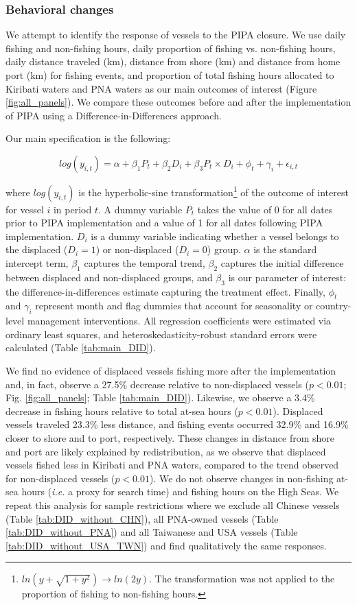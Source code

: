 \documentclass[12pt]{article}
\begin{document}
\subsubsection{Behavioral changes}

We attempt to identify the response of vessels to the PIPA closure. We use daily fishing and non-fishing hours, daily proportion of fishing vs. non-fishing hours, daily distance traveled (km), distance from shore (km) and distance from home port (km) for fishing events, and proportion of total fishing hours allocated to Kiribati waters and PNA waters as our main outcomes of interest (Figure \ref{fig:all_panels}). We compare these outcomes before and after the implementation of PIPA using a Difference-in-Differences approach.

Our main specification is the following:

$$
log(y_{i,t}) = \alpha + \beta_1 P_t + \beta_2 D_i + \beta_3 P_t \times D_i + \phi_t + \gamma_i + \epsilon_{i,t}
\label{eqn:did}
$$

\noindent where $log(y_{i,t})$ is the hyperbolic-sine transformation\footnote{$ln\left(y + \sqrt{1 + y^2}\right)\rightarrow ln(2y)$. The transformation was not applied to the proportion of fishing to non-fishing hours.} of the outcome of interest for vessel $i$ in period $t$. A dummy variable $P_t$ takes the value of 0 for all dates prior to PIPA implementation and a value of 1 for all dates following PIPA implementation. $D_i$ is a dummy variable indicating whether a vessel belongs to the displaced ($D_i = 1$) or non-displaced ($D_i = 0$) group. $\alpha$ is the standard intercept term, $\beta_1$ captures the temporal trend, $\beta_2$ captures the initial difference between displaced and non-displaced groups, and $\beta_3$ is our parameter of interest: the difference-in-differences estimate capturing the treatment effect. Finally, $\phi_t$ and $\gamma_i$ represent month and flag dummies that account for seasonality or country-level management interventions. All regression coefficients were estimated via ordinary least squares, and heteroskedasticity-robust standard errors were calculated (Table \ref{tab:main_DID}).

We find no evidence of displaced vessels fishing more after the implementation and, in fact, observe a 27.5\% decrease relative to non-displaced vessels ($p < 0.01$; Fig. \ref{fig:all_panels}; Table \ref{tab:main_DID}). Likewise, we observe a 3.4\% decrease in fishing hours relative to total at-sea hours ($p < 0.01$). Displaced vessels traveled 23.3\% less distance, and fishing events occurred 32.9\% and 16.9\% closer to shore and to port, respectively. These changes in distance from shore and port are likely explained by redistribution, as we observe that displaced vessels fished less in Kiribati and PNA waters, compared to the trend observed for non-displaced vessels ($p < 0.01$). We do not observe changes in non-fishing at-sea hours (\emph{i.e.} a proxy for search time) and fishing hours on the High Seas. We repeat this analysis for sample restrictions where we exclude all Chinese vessels (Table \ref{tab:DID_without_CHN}), all PNA-owned vessels (Table \ref{tab:DID_without_PNA}) and all Taiwanese and USA vessels (Table \ref{tab:DID_without_USA_TWN}) and find qualitatively the same responses.
\end{document}
